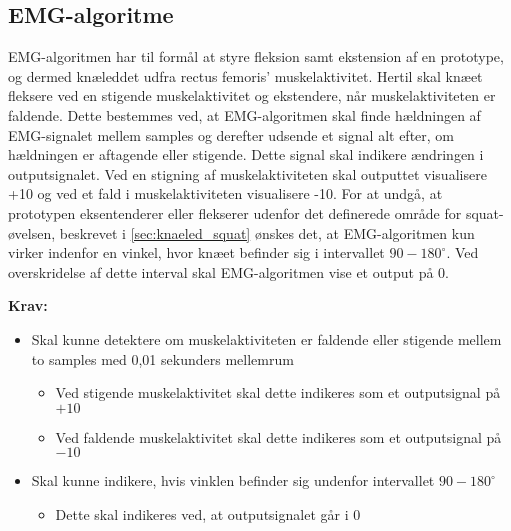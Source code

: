 \subsection{EMG-algoritme}\label{sec:krav_emg_algo}
EMG-algoritmen har til formål at styre fleksion samt ekstension af en prototype, og dermed knæleddet udfra rectus femoris' muskelaktivitet. Hertil skal knæet fleksere ved en stigende muskelaktivitet og ekstendere, når muskelaktiviteten er faldende.
Dette bestemmes ved, at EMG-algoritmen skal finde hældningen af EMG-signalet mellem samples og derefter udsende et signal alt efter, om hældningen er aftagende eller stigende. Dette signal skal indikere ændringen i outputsignalet. Ved en stigning af muskelaktiviteten skal outputtet visualisere +10 og ved et fald i muskelaktiviteten visualisere -10.
For at undgå, at prototypen eksentenderer eller flekserer udenfor det definerede område for squat-øvelsen, beskrevet i \autoref{sec:knaeled_squat} ønskes det, at EMG-algoritmen kun virker indenfor en vinkel, hvor knæet befinder sig i intervallet $90-180^{\circ}$. Ved overskridelse af dette interval skal EMG-algoritmen vise et output på 0.


\vspace{3mm}
\textbf{Krav:}
\begin{itemize}
\item Skal kunne detektere om muskelaktiviteten er faldende eller stigende mellem to samples med 0,01 sekunders mellemrum
\begin{itemize}
\item Ved stigende muskelaktivitet skal dette indikeres som et outputsignal på $+10$
\item Ved faldende muskelaktivitet skal dette indikeres som et outputsignal på $-10$
\end{itemize}
\item Skal kunne indikere, hvis vinklen befinder sig undenfor intervallet $90-180^{\circ}$
\begin{itemize}
\item Dette skal indikeres ved, at outputsignalet går i $0$
\end{itemize}
\end{itemize}


